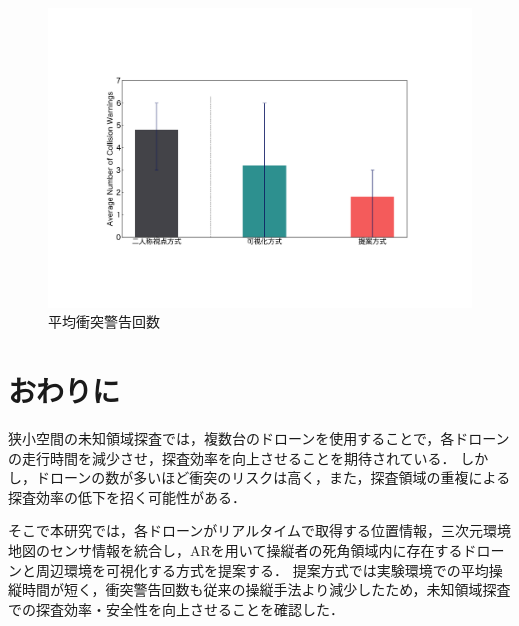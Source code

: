 \documentclass[a4paper,10pt,twocolumn,uplatex]{jsarticle}
\begin{document}
\begin{figure}[!tb]
  \centering
  \includegraphics[width=0.9\linewidth]{img/05_collision.pdf}
  \caption{平均衝突警告回数}
  \label{fig:05_collision}
\end{figure}



\section{おわりに}

狭小空間の未知領域探査では，複数台のドローンを使用することで，各ドローンの走行時間を減少させ，探査効率を向上させることを期待されている．
しかし，ドローンの数が多いほど衝突のリスクは高く，また，探査領域の重複による探査効率の低下を招く可能性がある．

そこで本研究では，各ドローンがリアルタイムで取得する位置情報，三次元環境地図のセンサ情報を統合し，ARを用いて操縦者の死角領域内に存在するドローンと周辺環境を可視化する方式を提案する．
提案方式では実験環境での平均操縦時間が短く，衝突警告回数も従来の操縦手法より減少したため，未知領域探査での探査効率・安全性を向上させることを確認した．
\end{document}
